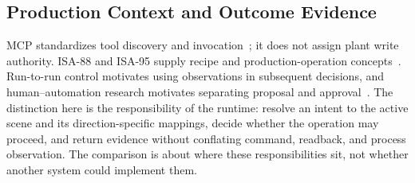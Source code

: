 \subsection{Production Context and Outcome Evidence}
MCP standardizes tool discovery and invocation~\cite{mcp2026}; it does not assign plant write authority. ISA-88 and ISA-95 supply recipe and production-operation concepts~\cite{isa88_2010,isa95_2025}. Run-to-run control motivates using observations in subsequent decisions, and human--automation research motivates separating proposal and approval~\cite{moyne2001r2r,parasuraman2000model}. The distinction here is the responsibility of the runtime: resolve an intent to the active scene and its direction-specific mappings, decide whether the operation may proceed, and return evidence without conflating command, readback, and process observation. The comparison is about where these responsibilities sit, not whether another system could implement them.
